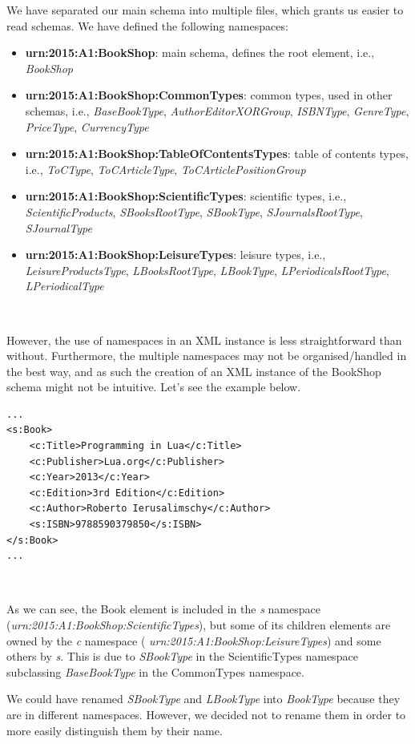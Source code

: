 We have separated our main schema into multiple files, which grants us easier
to read schemas. We have defined the following namespaces:

\begin{itemize}
    \item \textbf{urn:2015:A1:BookShop}: main schema, defines the root element,
    i.e., \emph{BookShop}
    
    \item \textbf{urn:2015:A1:BookShop:CommonTypes}: common types, used in other
    schemas, i.e., \emph{BaseBookType}, \emph{AuthorEditorXORGroup},
    \emph{ISBNType}, \emph{GenreType}, \emph{PriceType}, \emph{CurrencyType}
    
    \item \textbf{urn:2015:A1:BookShop:TableOfContentsTypes}: table of contents
    types, i.e., \emph{ToCType}, \emph{ToCArticleType},
    \emph{ToCArticlePositionGroup}
    
    \item \textbf{urn:2015:A1:BookShop:ScientificTypes}: scientific types, i.e.,
    \emph{ScientificProducts}, \emph{SBooksRootType}, \emph{SBookType},
    \emph{SJournalsRootType}, \emph{SJournalType}
    
    \item \textbf{urn:2015:A1:BookShop:LeisureTypes}: leisure types, i.e.,
    \emph{LeisureProductsType}, \emph{LBooksRootType}, \emph{LBookType},
    \emph{LPeriodicalsRootType}, \emph{LPeriodicalType}
\end{itemize}
\

However, the use of namespaces in an XML instance is less straightforward than
without. Furthermore, the multiple namespaces may not be organised/handled in
the best way, and as such the creation of an XML instance of the BookShop schema
might not be intuitive. Let's see the example below.\\

\begin{lstlisting}
...
<s:Book>
    <c:Title>Programming in Lua</c:Title>
    <c:Publisher>Lua.org</c:Publisher>
    <c:Year>2013</c:Year>
    <c:Edition>3rd Edition</c:Edition>
    <c:Author>Roberto Ierusalimschy</c:Author>
    <s:ISBN>9788590379850</s:ISBN>
</s:Book>
...
\end{lstlisting}
\

As we can see, the Book element is included in the \emph{s} namespace
(\emph{urn:2015:A1:BookShop:ScientificTypes}), but some of its
children elements are owned by the \emph{c} namespace (
\emph{urn:2015:A1:BookShop:LeisureTypes}) and some others by \emph{s}. This is
due to \emph{SBookType} in the ScientificTypes namespace subclassing
\emph{BaseBookType} in the CommonTypes namespace.\\

\begin{framehint}
We could have renamed \emph{SBookType} and \emph{LBookType} into \emph{BookType}
because they are in different namespaces. However, we decided not to rename them
in order to more easily distinguish them by their name.
\end{framehint}

\newpage

